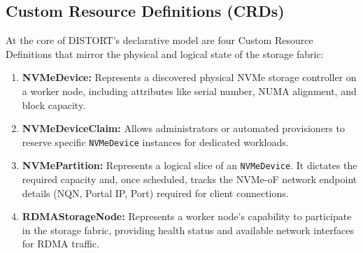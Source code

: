 \documentclass[sigconf]{acmart}
\begin{document}
\subsection{Custom Resource Definitions (CRDs)}
At the core of DISTORT's declarative model are four Custom Resource Definitions that mirror the physical and logical state of the storage fabric:
\begin{enumerate}
    \item \textbf{NVMeDevice:} Represents a discovered physical NVMe storage controller on a worker node, including attributes like serial number, NUMA alignment, and block capacity.
    \item \textbf{NVMeDeviceClaim:} Allows administrators or automated provisioners to reserve specific \texttt{NVMeDevice} instances for dedicated workloads.
    \item \textbf{NVMePartition:} Represents a logical slice of an \texttt{NVMeDevice}. It dictates the required capacity and, once scheduled, tracks the NVMe-oF network endpoint details (NQN, Portal IP, Port) required for client connections.
    \item \textbf{RDMAStorageNode:} Represents a worker node's capability to participate in the storage fabric, providing health status and available network interfaces for RDMA traffic.
\end{enumerate}
\end{document}

